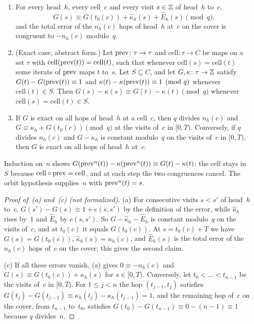 \begin{lemma}\label{lem:chain}
\begin{enumerate}[label=(\alph*)]
\item For every head~$h$, every cell~$c$ and every visit $s\in\mathbb{Z}$ of head~$h$ to~$c$,
\[
  G(s)\equiv G(t_0(c))+\hat\kappa_h(s)+\hat E_h(s)\pmod q,
\]
and the total error of the $n_h(c)$ hops of head~$h$ at~$c$ on the cover is congruent to $-n_h(c)$ modulo~$q$.
\item (Exact case, abstract form.) Let $\mathrm{prev}\colon\tau\to\tau$ and $\mathrm{cell}\colon\tau\to C$ be maps on a set
$\tau$ with $\mathrm{cell}(\mathrm{prev}(t))=\mathrm{cell}(t)$, such that whenever $\mathrm{cell}(s)=\mathrm{cell}(t)$ some
iterate of $\mathrm{prev}$ maps $t$ to~$s$. Let $S\subseteq C$, and let $G,\kappa\colon\tau\to\mathbb{Z}$ satisfy
$G(t)-G(\mathrm{prev}(t))\equiv1$ and $\kappa(t)-\kappa(\mathrm{prev}(t))\equiv1\pmod q$ whenever $\mathrm{cell}(t)\in S$. Then
$G(s)-\kappa(s)\equiv G(t)-\kappa(t)\pmod q$ whenever $\mathrm{cell}(s)=\mathrm{cell}(t)\in S$.
\item If $G$ is exact on all hops of head~$h$ at a cell~$c$, then $q$ divides $n_h(c)$ and
$G\equiv\kappa_h+G(t_0(c))\pmod q$ at the visits of~$c$ in $[0,T)$. Conversely, if $q$ divides $n_h(c)$ and
$G-\kappa_h$ is constant modulo~$q$ on the visits of~$c$ in $[0,T)$, then $G$ is exact on all hops of head~$h$ at~$c$.
\end{enumerate}
\end{lemma}

\begin{outline}
Induction on~$n$ shows $G(\mathrm{prev}^n(t))-\kappa(\mathrm{prev}^n(t))\equiv G(t)-\kappa(t)$: the cell stays in~$S$ because
$\mathrm{cell}\circ\mathrm{prev}=\mathrm{cell}$, and at each step the two congruences cancel. The orbit hypothesis supplies~$n$
with $\mathrm{prev}^n(t)=s$.
\end{outline}

\begin{proof}[Proof of~(a) and~(c) (not formalized)]
(a) For consecutive visits $s<s'$ of head~$h$ to~$c$, $G(s')-G(s)\equiv1+e(s,s')$ by the definition of the error,
while $\hat\kappa_h$ rises by~$1$ and $\hat E_h$ by $e(s,s')$. So $G-\hat\kappa_h-\hat E_h$ is constant modulo~$q$ on
the visits of~$c$, and at $t_0(c)$ it equals $G(t_0(c))$. At $s=t_0(c)+T$ we have $G(s)=G(t_0(c))$,
$\hat\kappa_h(s)=n_h(c)$, and $\hat E_h(s)$ is the total error of the $n_h(c)$ hops of~$c$ on the cover; this gives the
second claim.

(c) If all these errors vanish, (a) gives $0\equiv-n_h(c)$ and $G(s)\equiv G(t_0(c))+\kappa_h(s)$ for
$s\in[0,T)$. Conversely, let $t_0<\dots<t_{n-1}$ be the visits of~$c$ in $[0,T)$. For $1\le j<n$ the hop
$(t_{j-1},t_j)$ satisfies $G(t_j)-G(t_{j-1})\equiv\kappa_h(t_j)-\kappa_h(t_{j-1})=1$, and the remaining hop of~$c$ on
the cover, from $t_{n-1}$ to~$t_0$, satisfies $G(t_0)-G(t_{n-1})\equiv0-(n-1)\equiv1$ because $q$ divides~$n$.
\end{proof}


